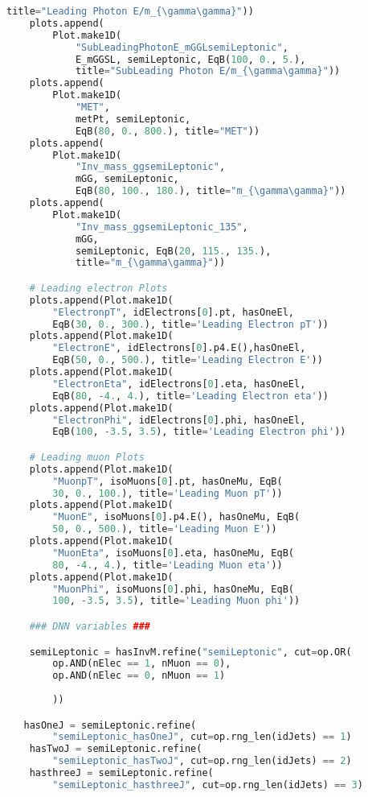 \begin{lstlisting}[language=Python, caption=Python module of the analysis used in Bamboo framework, label={bamboocode}]
        title="Leading Photon E/m_{\gamma\gamma}"))
    plots.append(
        Plot.make1D(
            "SubLeadingPhotonE_mGGLsemiLeptonic",
            E_mGGSL, semiLeptonic, EqB(100, 0., 5.),
            title="SubLeading Photon E/m_{\gamma\gamma}"))
    plots.append(
        Plot.make1D(
            "MET",
            metPt, semiLeptonic,
            EqB(80, 0., 800.), title="MET"))
    plots.append(
        Plot.make1D(
            "Inv_mass_ggsemiLeptonic",
            mGG, semiLeptonic,
            EqB(80, 100., 180.), title="m_{\gamma\gamma}"))
    plots.append(
        Plot.make1D(
            "Inv_mass_ggsemiLeptonic_135",
            mGG,
            semiLeptonic, EqB(20, 115., 135.),
            title="m_{\gamma\gamma}"))

    # Leading electron Plots
    plots.append(Plot.make1D(
        "ElectronpT", idElectrons[0].pt, hasOneEl,
        EqB(30, 0., 300.), title='Leading Electron pT'))
    plots.append(Plot.make1D(
        "ElectronE", idElectrons[0].p4.E(),hasOneEl,
        EqB(50, 0., 500.), title='Leading Electron E'))
    plots.append(Plot.make1D(
        "ElectronEta", idElectrons[0].eta, hasOneEl,
        EqB(80, -4., 4.), title='Leading Electron eta'))
    plots.append(Plot.make1D(
        "ElectronPhi", idElectrons[0].phi, hasOneEl,
        EqB(100, -3.5, 3.5), title='Leading Electron phi'))

    # Leading muon Plots
    plots.append(Plot.make1D(
        "MuonpT", isoMuons[0].pt, hasOneMu, EqB(
        30, 0., 100.), title='Leading Muon pT'))
    plots.append(Plot.make1D(
        "MuonE", isoMuons[0].p4.E(), hasOneMu, EqB(
        50, 0., 500.), title='Leading Muon E'))
    plots.append(Plot.make1D(
        "MuonEta", isoMuons[0].eta, hasOneMu, EqB(
        80, -4., 4.), title='Leading Muon eta'))
    plots.append(Plot.make1D(
        "MuonPhi", isoMuons[0].phi, hasOneMu, EqB(
        100, -3.5, 3.5), title='Leading Muon phi'))

    ### DNN variables ###

    semiLeptonic = hasInvM.refine("semiLeptonic", cut=op.OR(
        op.AND(nElec == 1, nMuon == 0),
        op.AND(nElec == 0, nMuon == 1)
        
        ))

   hasOneJ = semiLeptonic.refine(
        "semiLeptonic_hasOneJ", cut=op.rng_len(idJets) == 1)
    hasTwoJ = semiLeptonic.refine(
        "semiLeptonic_hasTwoJ", cut=op.rng_len(idJets) == 2)
    hasthreeJ = semiLeptonic.refine(
        "semiLeptonic_hasthreeJ", cut=op.rng_len(idJets) == 3)


\end{lstlisting}
